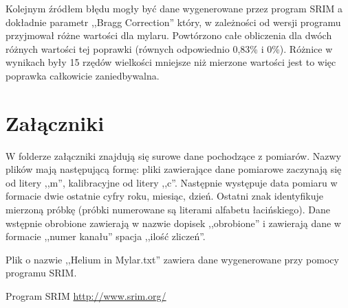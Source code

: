 \documentclass[12pt,a4paper]{article}
\begin{document}
Kolejnym źródłem błędu mogły być dane wygenerowane przez program SRIM a dokładnie parametr ,,Bragg Correction'' który, w zależności od wersji programu przyjmował różne wartości dla mylaru. Powtórzono całe obliczenia dla dwóch różnych wartości tej poprawki (równych odpowiednio 0,83\% i 0\%). Różnice w wynikach były 15 rzędów wielkości mniejsze niż mierzone wartości jest to więc poprawka całkowicie zaniedbywalna. 

\section{Załączniki}
W folderze załączniki znajdują się surowe dane pochodzące z pomiarów. Nazwy plików mają następującą formę: pliki zawierające dane pomiarowe zaczynają się od litery ,,m'', kalibracyjne od litery ,,c''. Następnie występuje data pomiaru w formacie dwie ostatnie cyfry roku, miesiąc, dzień. Ostatni znak identyfikuje mierzoną próbkę (próbki numerowane są literami alfabetu łacińskiego). Dane wstępnie obrobione zawierają w nazwie dopisek ,,\textunderscore obrobione'' i zawierają dane w formacie ,,numer kanału'' spacja ,,ilość zliczeń''.

Plik o nazwie ,,Helium in Mylar.txt'' zawiera dane wygenerowane przy pomocy programu SRIM. 

\begin{thebibliography}{9}
Program SRIM
\url{http://www.srim.org/}
\end{thebibliography}
\end{document}
